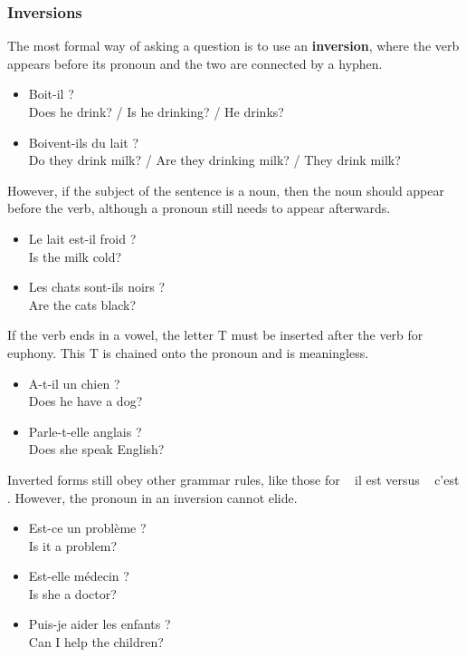\subsubsection{Inversions}

The most formal way of asking a question is to use an \textbf{inversion}, where the verb appears before its pronoun and the two are connected by a hyphen.

\begin{itemize}
  \item  Boit-il ? \\ Does he drink? / Is he drinking? / He drinks?
  \item  Boivent-ils du lait ? \\ Do they drink milk? / Are they drinking milk? / They drink milk?
\end{itemize}

However, if the subject of the sentence is a noun, then the noun should appear before the verb, although a pronoun still needs to appear afterwards.

\begin{itemize}
  \item  Le lait est-il froid ? \\ Is the milk cold?
  \item  Les chats sont-ils noirs ? \\ Are the cats black?
\end{itemize}

If the verb ends in a vowel, the letter T must be inserted after the verb for euphony. This T is chained onto the pronoun and is meaningless.

\begin{itemize}
  \item  A-t-il un chien ? \\ Does he have a dog?
  \item  Parle-t-elle anglais ? \\ Does she speak English?
\end{itemize}

Inverted forms still obey other grammar rules, like those for \guillemotleft~ il est \guillemotright versus \guillemotleft~ c'est \guillemotright . However, the pronoun in an inversion cannot elide.

\begin{itemize}
  \item  Est-ce un probl{\`e}me ? \\ Is it a problem?
  \item  Est-elle m{\'e}decin ? \\ Is she a doctor?
  \item  Puis-je aider les enfants ? \\ Can I help the children?
\end{itemize}

